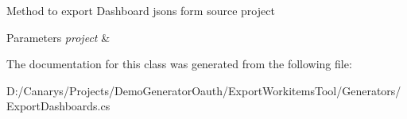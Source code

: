 Method to export Dashboard jsons form source project 


\begin{DoxyParams}{Parameters}
{\em project} & \\
\hline
\end{DoxyParams}


The documentation for this class was generated from the following file\+:\begin{DoxyCompactItemize}
\item 
D\+:/\+Canarys/\+Projects/\+Demo\+Generator\+Oauth/\+Export\+Workitems\+Tool/\+Generators/Export\+Dashboards.\+cs\end{DoxyCompactItemize}
